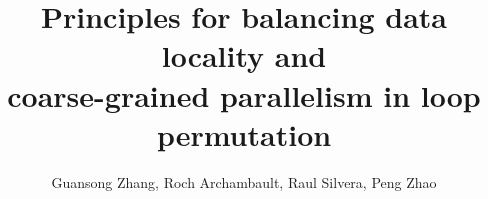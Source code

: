 
\date{}      %

\title{\bf Principles for balancing data locality and \\ coarse-grained parallelism in loop permutation}

\author{Guansong Zhang, Roch Archambault, Raul Silvera, Peng Zhao} 


\maketitle

\thispagestyle{empty}
